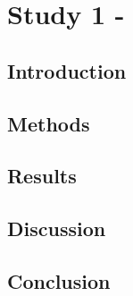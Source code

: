 \chapter{Study 1 - }
\label{label:S1}

\section{Introduction}
\label{label:S1_intro}

\section{Methods}
\label{label:S1_methods}

\section{Results}
\label{label:S1_results}

\section{Discussion}
\label{label:S1_discussion}

\section{Conclusion}
\label{label:S1_conclusion}